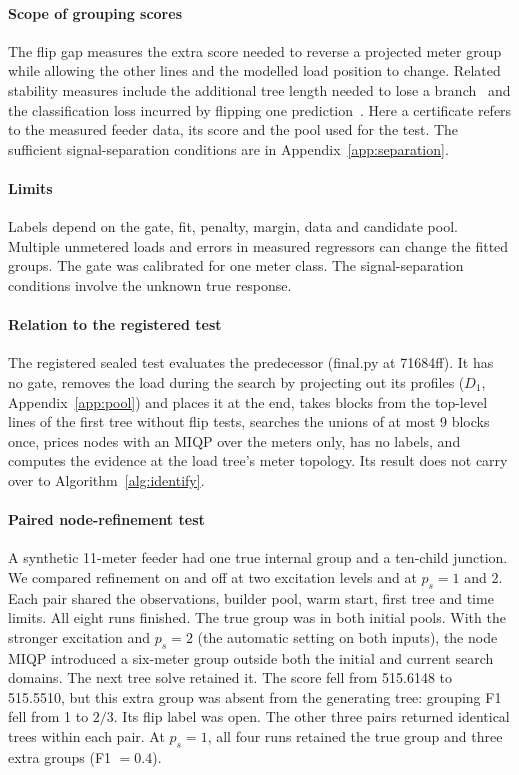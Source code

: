 \documentclass[journal,onecolumn,11pt]{IEEEtran}
\begin{document}
\paragraph*{Scope of grouping scores}
The flip gap measures the extra score needed to reverse a projected meter group while allowing the other
lines and the modelled load position to change. Related stability measures include the additional tree length
needed to lose a branch~\cite{bremer} and the classification loss incurred by flipping one prediction~\cite{marx}.
Here a certificate refers to the measured feeder data, its score and the pool used for the test.
The sufficient signal-separation conditions are in Appendix~\ref{app:separation}.

\paragraph*{Limits} Labels depend on the gate, fit, penalty, margin, data and candidate pool. Multiple unmetered
loads and errors in measured regressors can change the fitted groups. The gate was calibrated for one meter class.
The signal-separation conditions involve the unknown true response.

\paragraph*{Relation to the registered test} The registered sealed test evaluates the predecessor (final.py at 71684ff). It
has no gate, removes the load during the search by projecting out its profiles ($D_1$, Appendix~\ref{app:pool}) and places it at the end, takes blocks from the top-level
lines of the first tree without flip tests, searches the unions of at most 9 blocks once, prices nodes with an MIQP over the
meters only, has no labels, and computes the evidence at the load tree's meter topology. Its result does not carry over to
Algorithm~\ref{alg:identify}.

\paragraph*{Paired node-refinement test}
A synthetic 11-meter feeder had one true internal group and a ten-child junction. We compared refinement on
and off at two excitation levels and at $p_s=1$ and $2$. Each pair shared the observations, builder pool, warm
start, first tree and time limits. All eight runs finished. The true group was in both initial pools.
With the stronger excitation and $p_s=2$ (the automatic setting on both inputs), the node MIQP introduced a
six-meter group outside both the initial and current search domains. The next tree solve retained it.
The score fell from 515.6148 to 515.5510, but this extra group was absent from the generating tree:
grouping F1 fell from 1 to $2/3$. Its flip label was open. The other three pairs returned identical trees within
each pair. At $p_s=1$, all four runs retained the true group and three extra groups (F1 $=0.4$).
\end{document}
